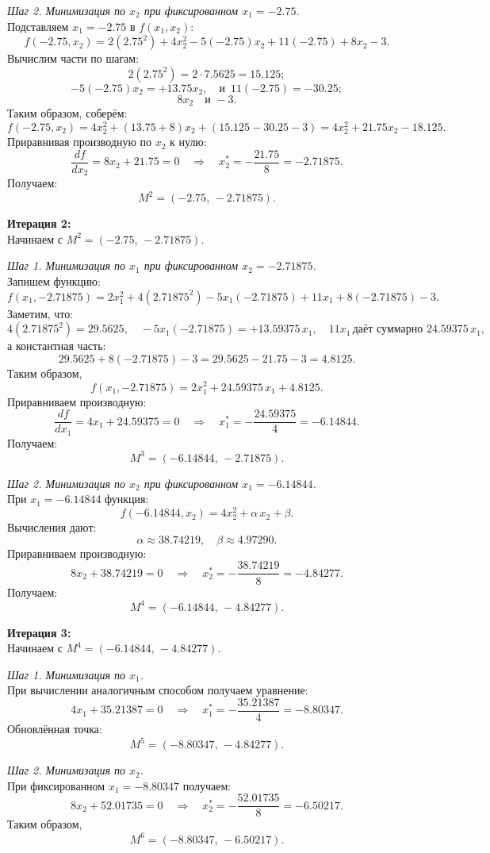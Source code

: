 \documentclass{article}
\begin{document}
\medskip
\emph{Шаг 2. Минимизация по \(x_2\) при фиксированном \(x_1=-2.75\).} \\
Подставляем \(x_1=-2.75\) в \(f(x_1,x_2)\):
\[
f(-2.75,x_2)=2(2.75^2)+4x_2^2-5(-2.75)x_2+11(-2.75)+8x_2-3.
\]
Вычислим части по шагам:
\[
2(2.75^2)=2\cdot7.5625=15.125;
\]
\[
-5(-2.75)x_2=+13.75x_2,\quad\text{и }\,11(-2.75)=-30.25;
\]
\[
8x_2\quad \text{и } -3.
\]
Таким образом, соберём:
\[
f(-2.75,x_2)=4x_2^2+(13.75+8)x_2+(15.125-30.25-3)=4x_2^2+21.75x_2-18.125.
\]
Приравнивая производную по \(x_2\) к нулю:
\[
\frac{d f}{dx_2}=8x_2+21.75=0\quad\Longrightarrow\quad x_2^*=-\frac{21.75}{8}=-2.71875.
\]
Получаем:
\[
M^2=(-2.75,\,-2.71875).
\]

\medskip
\textbf{Итерация 2:} \\
Начинаем с \(M^2=(-2.75,\,-2.71875)\).

\medskip
\emph{Шаг 1. Минимизация по \(x_1\) при фиксированном \(x_2=-2.71875\).} \\
Запишем функцию:
\[
f(x_1,-2.71875)=2x_1^2+4(2.71875^2)-5x_1(-2.71875)+11x_1+8(-2.71875)-3.
\]
Заметим, что:
\[
4(2.71875^2)=29.5625,\quad -5x_1(-2.71875)=+13.59375\,x_1,\quad 11x_1\,\text{даёт суммарно }24.59375\,x_1,
\]
а константная часть:
\[
29.5625+8(-2.71875)-3=29.5625-21.75-3=4.8125.
\]
Таким образом,
\[
f(x_1,-2.71875)=2x_1^2+24.59375\,x_1+4.8125.
\]
Приравниваем производную:
\[
\frac{d f}{dx_1}=4x_1+24.59375=0\quad\Longrightarrow\quad x_1^*=-\frac{24.59375}{4}=-6.14844.
\]
Получаем:
\[
M^3=(-6.14844,\,-2.71875).
\]

\medskip
\emph{Шаг 2. Минимизация по \(x_2\) при фиксированном \(x_1=-6.14844\).} \\
При \(x_1=-6.14844\) функция:
\[
f(-6.14844,x_2)=4x_2^2+\alpha\, x_2+\beta.
\]
Вычисления дают:
\[
\alpha\approx38.74219,\quad \beta\approx4.97290.
\]
Приравниваем производную:
\[
8x_2+38.74219=0\quad\Longrightarrow\quad x_2^*=-\frac{38.74219}{8}=-4.84277.
\]
Получаем:
\[
M^4=(-6.14844,\,-4.84277).
\]

\medskip
\textbf{Итерация 3:} \\
Начинаем с \(M^4=(-6.14844,\,-4.84277)\).

\medskip
\emph{Шаг 1. Минимизация по \(x_1\).} \\
При вычислении аналогичным способом получаем уравнение:
\[
4x_1+35.21387=0\quad\Longrightarrow\quad x_1^*=-\frac{35.21387}{4}=-8.80347.
\]
Обновлённая точка:
\[
M^5=(-8.80347,\,-4.84277).
\]

\medskip
\emph{Шаг 2. Минимизация по \(x_2\).} \\
При фиксированном \(x_1=-8.80347\) получаем:
\[
8x_2+52.01735=0\quad\Longrightarrow\quad x_2^*=-\frac{52.01735}{8}=-6.50217.
\]
Таким образом,
\[
M^6=(-8.80347,\,-6.50217).
\]
\end{document}
